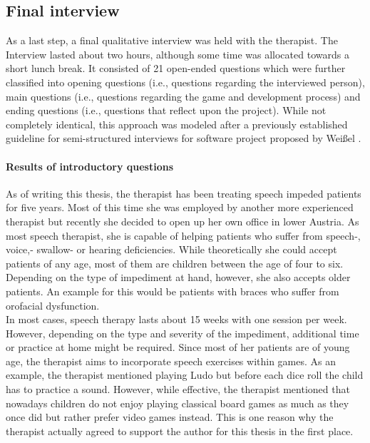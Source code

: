 \documentclass[draft,final]{vutinfth} %
\begin{document}
\subsection{Final interview}
As a last step, a final qualitative interview was held with the therapist. The Interview lasted about two hours, although some time was allocated towards a short lunch break. It consisted of 21 open-ended questions which were further classified  into opening questions (i.e., questions regarding the interviewed person),  main questions (i.e., questions regarding the game and development process) and ending questions (i.e., questions that reflect upon the project). While not completely identical, this approach was modeled after a previously established guideline for semi-structured interviews for software project proposed by Weißel \cite{wessel2010semi}.

\paragraph{Results of introductory questions} 
As of writing this thesis, the therapist has been treating speech impeded patients for five years. Most of this time she was employed by another more experienced therapist but recently she decided to open up her own office in lower Austria. As most speech therapist, she is capable of helping patients who suffer from speech-, voice,- swallow- or hearing deficiencies. While theoretically she could accept patients of any age, most of them are children between the age of four to six. Depending on the type of impediment at hand, however, she also accepts older patients. An example for this would be patients with braces who suffer from orofacial dysfunction. \\
In most cases, speech therapy lasts about 15 weeks with one session per week. However, depending on the type and severity of the impediment, additional time or practice at home might be required. Since most of her patients are of young age, the therapist aims to incorporate speech exercises within games. As an example, the therapist mentioned playing Ludo but before each dice roll the child has to practice a sound. However, while effective, the therapist mentioned that nowadays children do not enjoy playing classical board games as much as they once did but rather prefer video games instead. This is one reason why the therapist actually agreed to support the author for this thesis in the first place.
\end{document}
